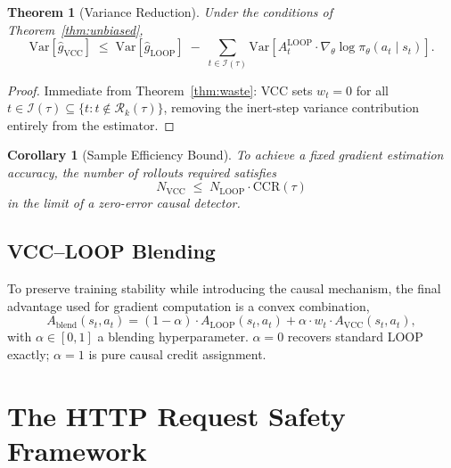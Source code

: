 \documentclass[11pt]{article}
\newtheorem{theorem}{Theorem}
\newtheorem{corollary}{Corollary}
\begin{document}
\begin{theorem}[Variance Reduction]
\label{thm:variance}
Under the conditions of Theorem~\ref{thm:unbiased},
\begin{equation}
\mathrm{Var}[\hat{g}_{\mathrm{VCC}}] \;\leq\; \mathrm{Var}[\hat{g}_{\mathrm{LOOP}}] \;-\;
\sum_{t \in \mathcal{I}(\tau)} \mathrm{Var}\!\left[A_t^{\mathrm{LOOP}} \cdot \nabla_\theta \log \pi_\theta(a_t \mid s_t)\right].
\end{equation}
\end{theorem}

\begin{proof}
Immediate from Theorem~\ref{thm:waste}: VCC sets $w_t = 0$ for all
$t \in \mathcal{I}(\tau) \subseteq \{t : t \notin \mathcal{R}_k(\tau)\}$,
removing the inert-step variance contribution entirely from the estimator.
\end{proof}

\begin{corollary}[Sample Efficiency Bound]
To achieve a fixed gradient estimation accuracy, the number of rollouts
required satisfies
\begin{equation}
N_{\mathrm{VCC}} \;\leq\; N_{\mathrm{LOOP}} \cdot \mathrm{CCR}(\tau)
\end{equation}
in the limit of a zero-error causal detector.
\end{corollary}

\subsection{VCC--LOOP Blending}

To preserve training stability while introducing the causal mechanism, the
final advantage used for gradient computation is a convex combination,
\begin{equation}
A_{\mathrm{blend}}(s_t, a_t) = (1-\alpha) \cdot A_{\mathrm{LOOP}}(s_t, a_t) + \alpha \cdot w_t \cdot A_{\mathrm{VCC}}(s_t, a_t),
\end{equation}
with $\alpha \in [0,1]$ a blending hyperparameter. $\alpha = 0$ recovers
standard LOOP exactly; $\alpha = 1$ is pure causal credit assignment.

\section{The HTTP Request Safety Framework}
\label{sec:safety}
\end{document}
